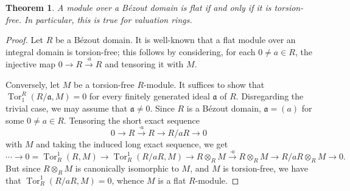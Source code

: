 \documentclass[11pt]{article}
\theoremstyle{thmstyle}
\newtheorem{theorem}{Theorem}[section]
\theoremstyle{defstyle}
\newcommand{\Tor}{\operatorname{Tor}}
\newcommand{\fraka}{\mathfrak{a}} %
\begin{document}
\begin{theorem}
    A module over a B\'ezout domain is flat if and only if it is torsion-free. In particular, this is true for valuation rings.
\end{theorem}
\begin{proof}
    Let $R$ be a B\'ezout domain. It is well-known that a flat module over an integral domain is torsion-free; this follows by considering, for each $0\ne a\in R$, the injective map $0\to R\xrightarrow{\cdot a} R$ and tensoring it with $M$.

    Conversely, let $M$ be a torsion-free $R$-module. It suffices to show that $\Tor^R_1(R/\fraka, M) = 0$ for every finitely generated ideal $\fraka$ of $R$. Disregarding the trivial case, we may assume that $\fraka\ne 0$. Since $R$ is a B\'ezout domain, $\fraka = (a)$ for some $0\ne a\in R$. Tensoring the short exact sequence 
    \begin{equation*}
        0\to R\xrightarrow{\cdot a} R\to R/aR\to 0
    \end{equation*}
    with $M$ and taking the induced long exact sequence, we get 
    \begin{equation*}
        \cdots\to 0 = \Tor^1_R(R, M)\to \Tor^1_R(R/aR, M)\to R\otimes_R M\xrightarrow{\cdot a} R\otimes_R M\to R/aR\otimes_R M\to 0.
    \end{equation*}
    But since $R\otimes_R M$ is canonically isomorphic to $M$, and $M$ is torsion-free, we have that $\Tor^1_R(R/aR, M) = 0$, whence $M$ is a flat $R$-module.
\end{proof}
\end{document}

